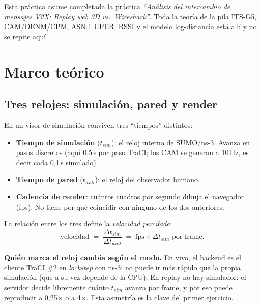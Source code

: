 \documentclass[11pt,a4paper]{article}
\begin{document}
\begin{notabox}[: prerrequisito]
Esta práctica asume completada la práctica \emph{``Análisis del intercambio de
mensajes V2X: Replay web 3D vs.\ Wireshark''}. Toda la teoría de la pila
ITS-G5, CAM/DENM/CPM, ASN.1 UPER, RSSI y el modelo log-distancia está allí y
no se repite aquí.
\end{notabox}

\section{Marco teórico}

\subsection{Tres relojes: simulación, pared y render}
\label{sec:relojes}

En un visor de simulación conviven tres ``tiempos'' distintos:

\begin{itemize}[leftmargin=1.6em, itemsep=2pt]
  \item \textbf{Tiempo de simulación} ($t_{sim}$): el reloj interno de
        SUMO/ns-3. Avanza en pasos discretos (aquí 0{,}5\,s por paso TraCI;
        los CAM se generan a 10\,Hz, es decir cada 0{,}1\,s simulado).
  \item \textbf{Tiempo de pared} ($t_{wall}$): el reloj del observador humano.
  \item \textbf{Cadencia de render}: cuántos cuadros por segundo dibuja el
        navegador (fps). No tiene por qué coincidir con ninguno de los dos
        anteriores.
\end{itemize}

La relación entre los tres define la \emph{velocidad percibida}:
\[
  \text{velocidad} \;=\; \frac{\Delta t_{sim}}{\Delta t_{wall}}
  \;=\; \text{fps} \times \Delta t_{sim}\text{ por frame.}
\]

\textbf{Quién marca el reloj cambia según el modo.} En vivo, el backend es el
cliente TraCI \#2 en \emph{lockstep} con ns-3: no puede ir más rápido que la
propia simulación (que a su vez depende de la CPU). En replay no hay
simulador: el servidor decide libremente cuánto $t_{sim}$ avanza por frame, y
por eso puede reproducir a 0{,}25$\times$ o a 4$\times$. Esta asimetría es la
clave del primer ejercicio.
\end{document}
